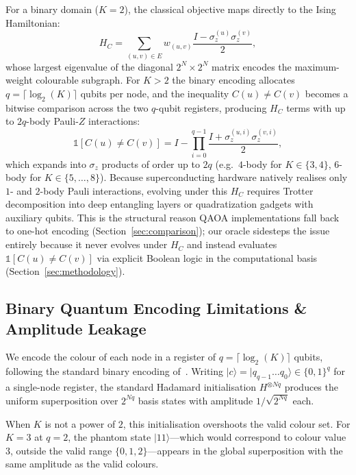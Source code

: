 \documentclass{ieeeaccess}
\begin{document}
For a binary domain ($K=2$), the classical objective maps directly to the Ising Hamiltonian:
\begin{equation}
H_C = \sum_{(u,v) \in E} w_{(u,v)} \frac{I - \sigma_z^{(u)} \sigma_z^{(v)}}{2},
\end{equation}
whose largest eigenvalue of the diagonal $2^N \times 2^N$ matrix encodes the maximum-weight colourable subgraph. For $K > 2$ the binary encoding allocates $q = \lceil \log_2(K) \rceil$ qubits per node, and the inequality $C(u) \neq C(v)$ becomes a bitwise comparison across the two $q$-qubit registers, producing $H_C$ terms with up to $2q$-body Pauli-$Z$ interactions:
\begin{equation}
\mathbb{1}[C(u) \neq C(v)] = I - \prod_{i=0}^{q-1} \frac{I + \sigma_z^{(u,i)} \sigma_z^{(v,i)}}{2},
\label{eq:high_body}
\end{equation}
which expands into $\sigma_z$ products of order up to $2q$ (e.g.\ $4$-body for $K \in \{3,4\}$, $6$-body for $K \in \{5,\dots,8\}$). Because superconducting hardware natively realises only $1$- and $2$-body Pauli interactions, evolving under this $H_C$ requires Trotter decomposition into deep entangling layers or quadratization gadgets with auxiliary qubits. This is the structural reason QAOA implementations fall back to one-hot encoding (Section~\ref{sec:comparison}); our oracle sidesteps the issue entirely because it never evolves under $H_C$ and instead evaluates $\mathbb{1}[C(u) \neq C(v)]$ via explicit Boolean logic in the computational basis (Section~\ref{sec:methodology}).

\subsection{Binary Quantum Encoding Limitations \& Amplitude Leakage}

We encode the colour of each node in a register of $q = \lceil \log_2(K) \rceil$ qubits, following the standard binary encoding of~\cite{saha2020}. Writing $|c\rangle = |q_{q-1} \dots q_0\rangle \in \{0,1\}^q$ for a single-node register, the standard Hadamard initialisation $H^{\otimes Nq}$ produces the uniform superposition over $2^{Nq}$ basis states with amplitude $1/\sqrt{2^{Nq}}$ each.

When $K$ is not a power of $2$, this initialisation overshoots the valid colour set. For $K = 3$ at $q = 2$, the phantom state $|11\rangle$---which would correspond to colour value $3$, outside the valid range $\{0,1,2\}$---appears in the global superposition with the same amplitude as the valid colours.
\end{document}
